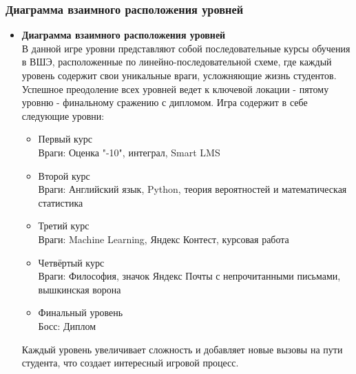 \documentclass{article}
\begin{document}
\subsubsection{Диаграмма взаимного расположения уровней}
    \begin{itemize}
    \item \textbf{Диаграмма взаимного расположения уровней} \\
    В данной игре уровни представляют собой последовательные курсы обучения в ВШЭ, расположенные по линейно-последовательной схеме, где каждый уровень содержит свои уникальные враги, усложняющие жизнь студентов. Успешное преодоление всех уровней ведет к ключевой локации - пятому уровню - финальному сражению с дипломом.
    Игра содержит в себе следующие уровни:
    \begin{itemize}
        \item Первый курс
        \\Враги: Оценка "-10", интеграл, Smart LMS
        \item Второй курс
        \\Враги: Английский язык, Python, теория вероятностей и математическая статистика
        \item Третий курс
        \\Враги: Machine Learning, Яндекс Контест, курсовая работа
        \item Четвёртый курс
        \\Враги: Философия, значок Яндекс Почты с непрочитанными письмами, вышкинская ворона
        \item Финальный уровень
       \\ Босс: Диплом
    \end{itemize}
    Каждый уровень увеличивает сложность и добавляет новые вызовы на пути студента, что создает интересный игровой процесс.
    \end{itemize}
\end{document}
